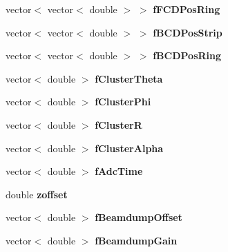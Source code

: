\begin{DoxyCompactItemize}
\item 
\mbox{\label{class_calibration_ac2f692c5e54aed9d508e63db2439855f}} 
vector$<$ vector$<$ double $>$ $>$ {\bfseries f\+F\+C\+D\+Pos\+Ring}
\item 
\mbox{\label{class_calibration_a3a011b25d22e065da7cc0e758dc73d63}} 
vector$<$ vector$<$ double $>$ $>$ {\bfseries f\+B\+C\+D\+Pos\+Strip}
\item 
\mbox{\label{class_calibration_a76aaf9355d2e29501ddc97028d9cb02a}} 
vector$<$ vector$<$ double $>$ $>$ {\bfseries f\+B\+C\+D\+Pos\+Ring}
\item 
\mbox{\label{class_calibration_a36c09ce185cc30ee60468f0aa5389cfc}} 
vector$<$ double $>$ {\bfseries f\+Cluster\+Theta}
\item 
\mbox{\label{class_calibration_a10bc108b3509126dff358fc6de052441}} 
vector$<$ double $>$ {\bfseries f\+Cluster\+Phi}
\item 
\mbox{\label{class_calibration_a8955f576f03e78c846e62a86207493c8}} 
vector$<$ double $>$ {\bfseries f\+ClusterR}
\item 
\mbox{\label{class_calibration_a8b7ad3ce59b00024a9380c1d752dcddc}} 
vector$<$ double $>$ {\bfseries f\+Cluster\+Alpha}
\item 
\mbox{\label{class_calibration_ad17489696497c9913e8fed070988fa28}} 
vector$<$ double $>$ {\bfseries f\+Adc\+Time}
\item 
\mbox{\label{class_calibration_ade913c7df571f0a30478efe4c9623de2}} 
double {\bfseries zoffset}
\item 
\mbox{\label{class_calibration_a079c74dbf6c4aa3120f4a5cc84601a59}} 
vector$<$ double $>$ {\bfseries f\+Beamdump\+Offset}
\item 
\mbox{\label{class_calibration_af321228730e63c14c6c87922e0159bda}} 
vector$<$ double $>$ {\bfseries f\+Beamdump\+Gain}
\item 

\end{DoxyCompactItemize}
